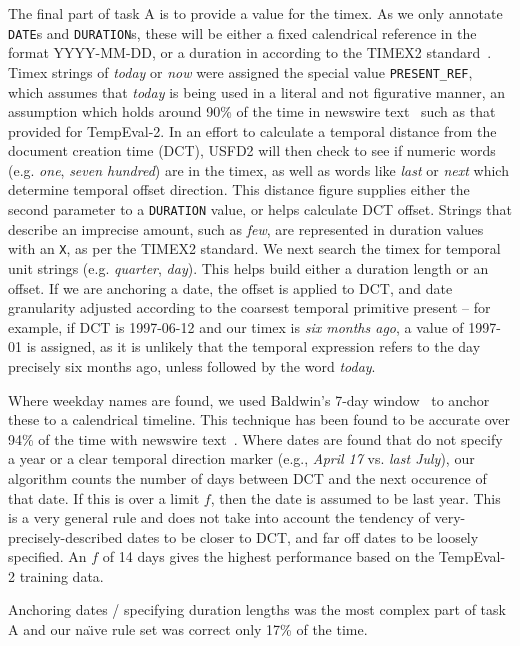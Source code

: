 \documentclass[11pt]{article}
\begin{document}
The final part of task A is to provide a value for the timex. As we only annotate {\tt DATE}s and {\tt DURATION}s, these will be either a fixed calendrical reference in the format YYYY-MM-DD, or a duration in according to the TIMEX2 standard~\cite{ferro2005tides}. Timex strings of \emph{today} or \emph{now} were assigned the special value {\tt PRESENT\_REF}, which assumes that \emph{today} is being used in a literal and not figurative manner, an assumption which holds around 90\% of the time in newswire text~\cite{ahn2005towards} such as that provided for TempEval-2. In an effort to calculate a temporal distance from the document creation time (DCT), USFD2 will then check to see if numeric words (e.g. \emph{one}, \emph{seven hundred}) are in the timex, as well as words like \emph{last} or \emph{next} which determine temporal offset direction. This distance figure supplies either the second parameter to a {\tt DURATION} value, or helps calculate DCT offset. Strings that describe an imprecise amount, such as \emph{few}, are represented in duration values with an {\tt X}, as per the TIMEX2 standard. We next search the timex for temporal unit strings (e.g. \emph{quarter}, \emph{day}). This helps build either a duration length or an offset. If we are anchoring a date, the offset is applied to DCT, and date granularity adjusted according to the coarsest temporal primitive present -- for example, if DCT is 1997-06-12 and our timex is \emph{six months ago}, a value of 1997-01 is assigned, as it is unlikely that the temporal expression refers to the day precisely six months ago, unless followed by the word \emph{today}.

Where weekday names are found, we used Baldwin's 7-day window~\cite{baldwin2002learning} to anchor these to a calendrical timeline. This technique has been found to be accurate over 94\% of the time with newswire text~\cite{mazur2008s}. Where dates are found that do not specify a year or a clear temporal direction marker (e.g., \emph{April 17} vs. \emph{last July}), our algorithm counts the number of days between DCT and the next occurence of that date. If this is over a limit $f$, then the date is assumed to be last year. This is a very general rule and does not take into account the tendency of very-precisely-described dates to be closer to DCT, and far off dates to be loosely specified. An $f$ of 14 days gives the highest performance based on the TempEval-2 training data.

Anchoring dates / specifying duration lengths was the most complex part of task A and our na\"{\i}ve rule set was correct only 17\% of the time.
\end{document}
